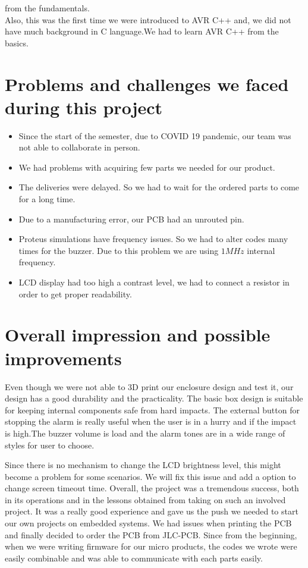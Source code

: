 from the fundamentals.\\
Also, this was the first time we were introduced to AVR C++ and, we did not have much background in C language.We had to learn AVR C++ from the basics.

\section{Problems and challenges we faced during this project}

\begin{itemize}
\item Since the start of the semester, due to COVID 19 pandemic, our team was not able to collaborate in person.
\item We had problems with acquiring few parts we needed for our product.
\item The deliveries were delayed. So we had to wait for the ordered parts to come for a long time.
\item Due to a manufacturing error, our PCB had an unrouted pin.
\item Proteus simulations have frequency issues. So we had to alter codes many times for the buzzer. Due to this problem we are using $1MHz$ internal frequency.
\item LCD display had too high a contrast level, we had to connect a resistor in order to get proper readability.
    
\end{itemize}

\section{Overall impression and possible improvements}
Even though we were not able to 3D print our enclosure design and test it, our design has a good durability and the practicality. The basic box design is suitable for keeping internal components safe from hard impacts. The external button for stopping the alarm is really useful when the user is in a hurry and if the impact is high.The buzzer volume is load and the alarm tones are in a wide range of styles for user to choose.

Since there is no mechanism to change the LCD brightness level, this might become a problem for some scenarios. We will fix this issue and add a option to change screen timeout time.
\newpage
Overall, the project was a tremendous success, both in its operations and in the lessons obtained from taking on such an involved project. It was a really good experience and gave us the push we needed to start our own projects on embedded systems.
We had issues when printing the PCB and finally decided to order the PCB from JLC-PCB. Since from the beginning, when we were writing firmware for our micro products, the codes we wrote were easily combinable and was able to communicate with each parts easily. 

